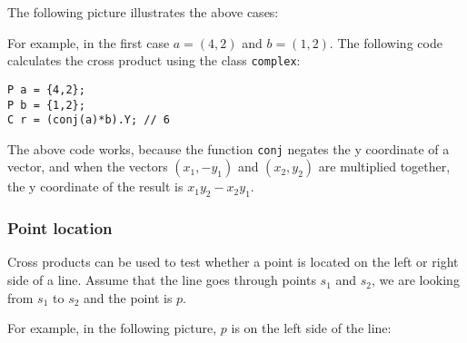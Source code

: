 The following picture illustrates the above cases:
\begin{center}
\end{center}

\noindent
For example, in the first case
$a=(4,2)$ and $b=(1,2)$.
The following code calculates the cross product
using the class \texttt{complex}:

\begin{lstlisting}
P a = {4,2};
P b = {1,2};
C r = (conj(a)*b).Y; // 6
\end{lstlisting}

The above code works, because
the function \texttt{conj} negates the y coordinate
of a vector,
and when the vectors $(x_1,-y_1)$ and $(x_2,y_2)$
are multiplied together, the y coordinate
of the result is $x_1 y_2 - x_2 y_1$.

\subsubsection{Point location}

Cross products can be used to test
whether a point is located on the left or right
side of a line.
Assume that the line goes through points
$s_1$ and $s_2$, we are looking from $s_1$
to $s_2$ and the point is $p$.

For example, in the following picture,
$p$ is on the left side of the line:
\begin{center}
\end{center}

